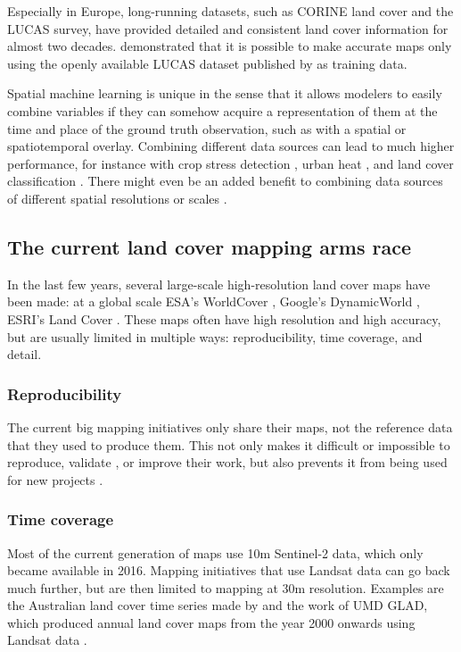         Especially in Europe, long-running datasets, such as CORINE land cover and the LUCAS survey, have provided detailed and consistent land cover information for almost two decades. \citet{pflugmacher2019mapping} demonstrated that it is possible to make accurate maps only using the openly available LUCAS dataset published by \citet{dandrimont2020harmonised} as training data.
        
        Spatial machine learning is unique in the sense that it allows modelers to easily combine variables if they can somehow acquire a representation of them at the time and place of the ground truth observation, such as with a spatial or spatiotemporal overlay. Combining different data sources can lead to much higher performance, for instance with crop stress detection  \citep{berger2022multi}, urban heat \citep{shahi2015novel}, and land cover classification \citep{zhu2016optimizing, hurskainen2019auxiliary, hosseiny2022urban}. There might even be an added benefit to combining data sources of different spatial resolutions or scales \citep{santos2012multiscale}.
    
\subsection*{The current land cover mapping arms race}
    
    In the last few years, several large-scale high-resolution land cover maps have been made: at a global scale ESA's WorldCover \citep{kerchove2021esa}, Google's DynamicWorld \citep{brown2022dynamic}, ESRI's Land Cover \citep{karra2021global}.
    These maps often have high resolution and high accuracy, but are usually limited in multiple ways: reproducibility, time coverage, and detail.
    
    \subsubsection{Reproducibility}
        The current big mapping initiatives only share their maps, not the reference data that they used to produce them. This not only makes it difficult or impossible to reproduce, validate \citep{venter2022global}, or improve their work, but also prevents it from being used for new projects \citep{tsendbazar2015assessing}.
    
    \subsubsection{Time coverage} 
        Most of the current generation of maps use 10m  Sentinel-2 data, which only became available in 2016. Mapping initiatives that use Landsat data can go back much further, but are then limited to mapping at 30m resolution. Examples are the Australian land cover time series made by \citep{calderon2021high} and the work of UMD GLAD, which produced annual land cover maps from the year 2000 onwards using Landsat data \citep{hansen2022global}.

